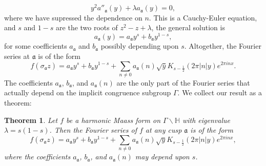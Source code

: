 \documentclass[12pt]{book}
\newtheorem{theorem}{Theorem}[section]
\theoremstyle{definition}\newframedtheorem{method}{Method}
\newcommand{\mf}{\mathfrak}
\renewcommand{\H}{\mathbb{H}}
\renewcommand{\l}{\lambda}
\newcommand{\s}{\sigma}
\newcommand{\G}{\Gamma}
\newcommand{\<}{\langle}
\renewcommand{\>}{\rangle}
\newcommand{\GH}{\G\backslash\H}
\begin{document}
      \[
        y^{2}a''_{\mf{a}}(y)+\l a_{\mf{a}}(y) = 0,
      \]
      where we have supressed the dependence on $n$. This is a Cauchy-Euler equation, and $s$ and $1-s$ are the two roots of $z^{2}-z+\l$, the general solution is
      \[
        a_{\mf{a}}(y) = a_{\mf{a}}y^{s}+b_{\mf{a}}y^{1-s},
      \]
      for some coefficients $a_{\mf{a}}$ and $b_{\mf{a}}$ possibly depending upon $s$. Altogether, the Fourier series at $\mf{a}$ is of the form
      \[
        f(\s_{\mf{a}}z) = a_{\mf{a}}y^{s}+b_{\mf{a}}y^{1-s}+\sum_{n \neq 0}a_{\mf{a}}(n)\sqrt{y}K_{s-\frac{1}{2}}(2\pi|n|y)e^{2\pi inx}.
      \]
      The coefficients $a_{\mf{a}}$, $b_{\mf{a}}$, and $a_{\mf{a}}(n)$ are the only part of the Fourier series that actually depend on the implicit congruence subgroup $\G$. We collect our result as a theorem:

      \begin{theorem}\label{thm:Fourier_series_of_a_Maass_form}
        Let $f$ be a harmonic Maass form on $\GH$ with eigenvalue $\l = s(1-s)$. Then the Fourier series of $f$ at any cusp $\mf{a}$ is of the form
        \[
          f(\s_{\mf{a}}z) = a_{\mf{a}}y^{s}+b_{\mf{a}}y^{1-s}+\sum_{n \neq 0}a_{\mf{a}}(n)\sqrt{y}K_{s-\frac{1}{2}}(2\pi|n|y)e^{2\pi inx},
        \]
        where the coefficients $a_{\mf{a}}$, $b_{\mf{a}}$, and $a_{\mf{a}}(n)$ may depend upon $s$.
      \end{theorem}
\end{document}
